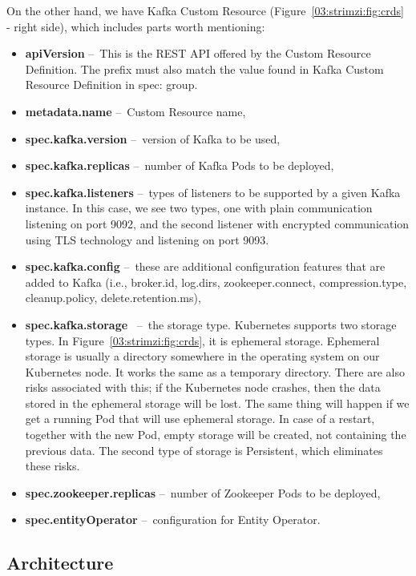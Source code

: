 On the other hand, we have Kafka Custom Resource (Figure~\ref{03:strimzi:fig:crds} - right side), which includes parts worth mentioning:
\begin{itemize}[itemsep=1mm, parsep=0pt]
    \item \textbf{apiVersion} \---\ This is the REST API offered by the Custom Resource Definition.
    The prefix must also match the value found in Kafka Custom Resource Definition in spec: group.
    \item \textbf{metadata.name} \---\ Custom Resource name,
    \item \textbf{spec.kafka.version} \---\ version of Kafka to be used,
    \item \textbf{spec.kafka.replicas} \---\ number of Kafka Pods to be deployed,
    \item \textbf{spec.kafka.listeners} \---\ types of listeners to be supported by a given Kafka instance.
    In this case, we see two types, one with plain communication listening on port 9092, and the second listener with encrypted communication using TLS technology and listening on port 9093.
    \item  \textbf{spec.kafka.config} \---\ these are additional configuration features that are added to Kafka (i.e., broker.id, log.dirs, zookeeper.connect, compression.type, cleanup.policy, delete.retention.ms),
    \item  \textbf{spec.kafka.storage}~\cite{strimziStorageBlogPost} \---\ the storage type.
    Kubernetes supports two storage types.
    In Figure~\ref{03:strimzi:fig:crds}, it is ephemeral storage.
    Ephemeral storage is usually a directory somewhere in the operating system on our Kubernetes node.
    It works the same as a temporary directory.
    There are also risks associated with this; if the Kubernetes node crashes, then the data stored in the ephemeral storage will be lost.
    The same thing will happen if we get a running Pod that will use ephemeral storage.
    In case of a restart, together with the new Pod, empty storage will be created, not containing the previous data.
    The second type of storage is Persistent, which eliminates these risks.
    \item \textbf{spec.zookeeper.replicas} \---\ number of Zookeeper Pods to be deployed,
    \item \textbf{spec.entityOperator} \---\ configuration for Entity Operator.
\end{itemize}

\subsection{Architecture}

